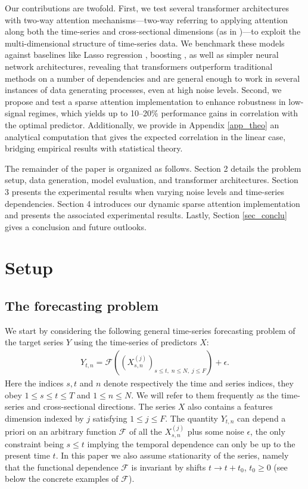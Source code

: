 \documentclass{article}
\begin{document}
Our contributions are twofold. First, we test several transformer architectures with two-way attention mechanisms—two-way referring to applying attention along both the time-series and cross-sectional dimensions (as in \cite{ho2019axial, liu2024itransformer})—to exploit the multi-dimensional structure of time-series data. We benchmark these models against baselines like Lasso regression \cite{tibshirani1996regression}, boosting \cite{friedman2001greedy}, as well as simpler neural network architectures, revealing that transformers outperform traditional methods on a number of dependencies and are general enough to work in several instances of data generating processes, even at high noise levels. Second, we propose and test a sparse attention implementation \cite{child2019generating} to enhance robustness in low-signal regimes, which yields up to 10--20$\%$ performance gains in correlation with the optimal predictor. Additionally, we provide in Appendix \ref{app_theo} an analytical computation that gives the expected correlation in the linear case, bridging empirical results with statistical theory.

The remainder of the paper is organized as follows. Section 2 details the problem setup, data generation, model evaluation, and transformer architectures. Section 3 presents the experimental results when varying noise levels and time-series dependencies. Section 4 introduces our dynamic sparse attention implementation and presents the associated experimental results. Lastly, Section \ref{sec_conclu} gives a conclusion and future outlooks.


\section{Setup}\label{sec_setup}

\subsection{The forecasting problem}

We start by considering the following general time-series forecasting problem of the target series $Y$ using the time-series of predictors $X$:
\begin{align}\label{forecasting_problem}
Y_{t,n} = \mathcal{F} \left( \left( X_{s,n}^{(j)} \right)_{s \leq t, \; n \leq N, \; j \leq F} \right) + \epsilon.
\end{align}
Here the indices $s,t$ and $n$ denote respectively the time and series indices, they obey $1 \leq s \leq t \leq T$ and $1 \leq n \leq N$. We will refer to them frequently as the time-series and cross-sectional directions. The series $X$ also contains a features dimension indexed by $j$ satisfying $1 \leq j \leq F$. The quantity $Y_{t,n}$ can depend a priori on an arbitrary function $\mathcal{F}$ of all the $X_{s,n}^{(j)}$ plus some noise $\epsilon$, the only constraint being $s \leq t$ implying the temporal dependence can only be up to the present time $t$. In this paper we also assume stationarity of the series, namely that the functional dependence $\mathcal{F}$ is invariant by shifts $t \rightarrow t + t_0$, $t_0 \geq 0$ (see below the concrete examples of $\mathcal{F}$).
\end{document}
